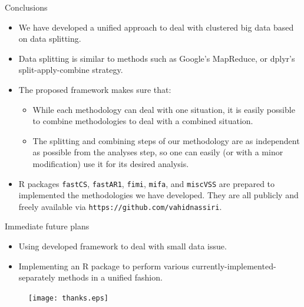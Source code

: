 \documentclass{beamer}
\begin{document}
\begin{frame}{Conclusions}
\begin{itemize}
\item We have developed a unified approach to deal with clustered big data based on data splitting. 
\item Data splitting is similar to methods such as Google's MapReduce, or dplyr's split-apply-combine strategy.
\item The proposed framework makes sure that:
\begin{itemize}
\item While each methodology can deal with one situation, it is easily possible to combine methodologies to deal with a combined situation.

\item The splitting and combining steps of our methodology are as independent as possible from the analyses step, so one can easily (or with a minor modification) use it for its desired analysis.

\end{itemize}
\item R packages {\tt{fastCS}}, {\tt{fastAR1}}, {\tt{fimi}}, {\tt{mifa}}, and {\tt{miscVSS}} are prepared to implemented the methodologies we have developed. They are all publicly and freely available via {\tt{https://github.com/vahidnassiri}}.

\end{itemize}


\end{frame}

\begin{frame}{Immediate future plans}
\begin{itemize}
\item Using developed framework to deal with small data issue.
\item Implementing an R package to perform various currently-implemented-separately methods in a unified fashion. 
\end{itemize}
\end{frame}

\begin{frame}
\begin{figure}
\centering
\texttt{[image: thanks.eps]}
\end{figure} 
\end{frame}
\end{document}
